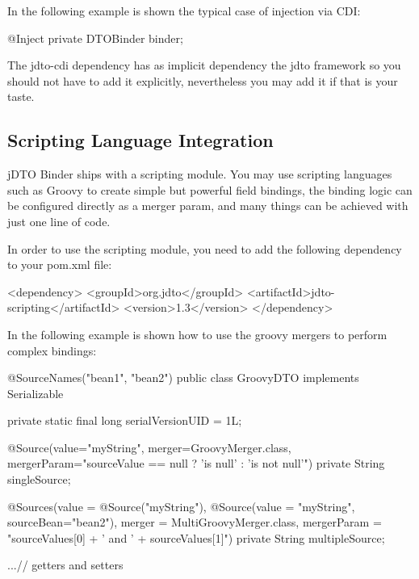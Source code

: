 \documentclass[11pt]{article}
\newcommand{\JDTO}{jDTO Binder\xspace}
\begin{document}
In the following example is shown the typical case of injection via CDI:


\begin{java}
@Inject
private DTOBinder binder;
\end{java}

The jdto-cdi dependency has as implicit dependency the jdto framework so you should not have to add it explicitly, nevertheless you may add it if that is your taste.

\subsection{Scripting Language Integration}

\JDTO ships with a scripting module. You may use scripting languages such as Groovy to create simple but powerful field bindings, the binding logic can be configured directly as a merger param, and many things can be achieved with just one line of code.

In order to use the scripting module, you need to add the following dependency to your pom.xml file:


\begin{xml}
    <dependency>
        <groupId>org.jdto</groupId>
        <artifactId>jdto-scripting</artifactId>
        <version>1.3</version>
    </dependency>
\end{xml}

In the following example is shown how to use the groovy mergers to perform complex bindings:


\begin{java}

@SourceNames({"bean1", "bean2"})
public class GroovyDTO implements Serializable {
    private static final long serialVersionUID = 1L;

    @Source(value="myString", merger=GroovyMerger.class, 
            mergerParam="sourceValue == null ? 'is null' : 'is not null'")
    private String singleSource;

    @Sources(value = {@Source("myString"), @Source(value = "myString", sourceBean="bean2")},
            merger = MultiGroovyMerger.class, 
            mergerParam = "sourceValues[0] + ' and ' + sourceValues[1]")
    private String multipleSource;

    ...// getters and setters

}

\end{java}
\end{document}
